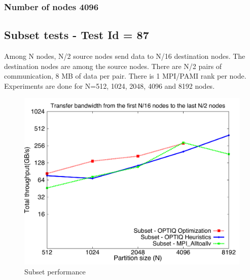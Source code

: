 \documentclass[letter]{article}
\begin{document}


\newpage

\subsubsection{Number of nodes 4096}





\newpage


%

%


\subsection{Subset tests - Test Id = 87}

Among N nodes, N/2 source nodes send data to N/16 destination nodes. The destination nodes are among the source nodes. There are N/2 pairs of communication, 8 MB of data per pair. There is 1 MPI/PAMI rank per node. Experiments are done for N=512, 1024, 2048, 4096 and 8192 nodes.

\begin{figure}[h]
\vspace{-0.1in}
\centering
\includegraphics[scale=0.40]{report_figures/constantr_87.pdf}
\vspace{-0.1in}
\caption{Subset performance}
\vspace{-0.1in}
\label{fig:patterns}
\end{figure}
\end{document}

